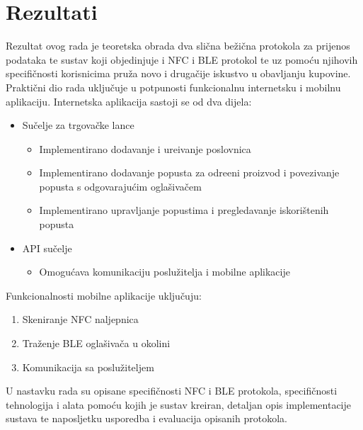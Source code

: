 \section{Rezultati}

Rezultat ovog rada je teoretska obrada dva sli\v{c}na be\v{z}i\v{c}na protokola za prijenos podataka te sustav koji objedinjuje i NFC i BLE protokol te uz pomo\'{c}u njihovih specifi\v{c}nosti korisnicima pru\v{z}a novo i druga\v{c}ije iskustvo u obavljanju kupovine. Prakti\v{c}ni dio rada uklju\v{c}uje u potpunosti funkcionalnu internetsku i mobilnu aplikaciju. Internetska aplikacija  sastoji se od dva dijela:

\begin{itemize}
	\item Su\v{c}elje za trgova\v{c}ke lance
	\begin{itemize}
		\item Implementirano dodavanje i ure\dj ivanje poslovnica
		\item Implementirano dodavanje popusta za odre\dj eni proizvod i povezivanje popusta s odgovaraju\'{c}im ogla\v{s}iva\v{c}em
		\item Implementirano upravljanje popustima i pregledavanje iskori\v{s}tenih popusta
	\end{itemize}
	\item API su\v{c}elje
	
	\begin{itemize}
		\item Omogu\'{c}ava komunikaciju poslu\v{z}itelja i mobilne aplikacije
	\end{itemize}
\end{itemize}

Funkcionalnosti mobilne aplikacije uklju\v{c}uju:
\begin{enumerate}
	\item Skeniranje NFC naljepnica
	\item Tra\v{z}enje BLE ogla\v{s}iva\v{c}a u okolini
	\item Komunikacija sa poslu\v{z}iteljem
\end{enumerate}

U nastavku rada su opisane specifi\v{c}nosti NFC i BLE protokola, specifi\v{c}nosti tehnologija i alata pomo\'{c}u kojih je sustav kreiran, detaljan opis implementacije sustava te naposljetku usporedba i evaluacija opisanih protokola.


